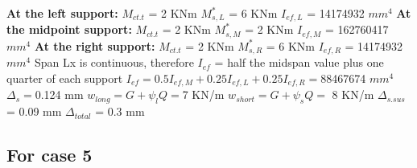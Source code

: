 \documentclass{article}%
\begin{document}
%
\newline%
\newline%
%
\textbf{At the left support:}%
\newline%
\newline%
%
$M_{ct.t}$ = 2 KNm%
\newline%
%
$M_{s,L}^{*}$ = 6 KNm%
\newline%
%
$I_{ef,L}$ = 14174932 $mm^{4}$%
\newline%
\newline%
%
\textbf{At the midpoint support:}%
\newline%
\newline%
%
$M_{ct.t}$ = 2 KNm%
\newline%
%
$M_{s,M}^{*}$ = 2 KNm%
\newline%
%
$I_{ef,M}$ = 162760417 $mm^{4}$%
\newline%
\newline%
%
\textbf{At the right support:}%
\newline%
\newline%
%
$M_{ct.t}$ = 2 KNm%
\newline%
%
$M_{s,R}^{*}$ = 6 KNm%
\newline%
%
$I_{ef,R}$ = 14174932 $mm^{4}$%
\newline%
\newline%
%
Span Lx is continuous, therefore $I_{ef}$ = half the midspan value plus one quarter of each support%
\newline%
\newline%
%
$I_{ef} = 0.5I_{ef,M} + 0.25I_{ef,L} + 0.25I_{ef,R} = $88467674 $ mm^{4}$%
\newline%
\newline%
%
$\Delta_{s} =$0.124 mm%
\newline%
\newline%
%
$w_{long} = G + \psi_{l}Q = $7 KN/m%
\newline%
%
$w_{short} = G + \psi_{s}Q = $ 8 KN/m%
\newline%
\newline%
%
$\Delta_{s.sus}$ = 0.09 mm%
\newline%
\newline%
%
$\Delta_{total}$ = 0.3 mm%
\subsection*{For case 5}%
\label{subsec:Forcase5}%
\end{document}
